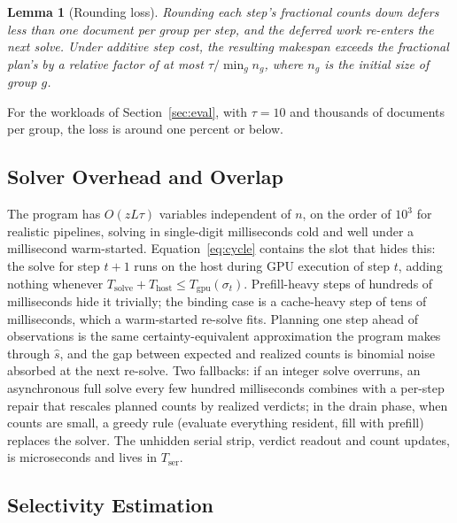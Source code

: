 \documentclass[10pt,twocolumn]{article}
\newtheorem{lemma}{Lemma}
\newcommand{\Tgpu}{T_{\mathrm{gpu}}}
\newcommand{\Thost}{T_{\mathrm{host}}}
\newcommand{\Tser}{T_{\mathrm{ser}}}
\newcommand{\shat}{\hat{s}}
\begin{document}
\begin{lemma}[Rounding loss]
\label{lem:round}
Rounding each step's fractional counts down defers less than one document per group per step, and the deferred work re-enters the next solve. Under additive step cost, the resulting makespan exceeds the fractional plan's by a relative factor of at most $\tau / \min_g n_g$, where $n_g$ is the initial size of group $g$.
\end{lemma}

For the workloads of Section~\ref{sec:eval}, with $\tau = 10$ and thousands of documents per group, the loss is around one percent or below.

\subsection{Solver Overhead and Overlap}
\label{sec:overhead}

The program has $O(zL\tau)$ variables independent of $n$, on the order of $10^3$ for realistic pipelines, solving in single-digit milliseconds cold and well under a millisecond warm-started. Equation~\eqref{eq:cycle} contains the slot that hides this: the solve for step $t{+}1$ runs on the host during GPU execution of step $t$, adding nothing whenever $T_{\mathrm{solve}} + \Thost \le \Tgpu(\sigma_t)$. Prefill-heavy steps of hundreds of milliseconds hide it trivially; the binding case is a cache-heavy step of tens of milliseconds, which a warm-started re-solve fits. Planning one step ahead of observations is the same certainty-equivalent approximation the program makes through $\shat$, and the gap between expected and realized counts is binomial noise absorbed at the next re-solve. Two fallbacks: if an integer solve overruns, an asynchronous full solve every few hundred milliseconds combines with a per-step repair that rescales planned counts by realized verdicts; in the drain phase, when counts are small, a greedy rule (evaluate everything resident, fill with prefill) replaces the solver. The unhidden serial strip, verdict readout and count updates, is microseconds and lives in $\Tser$.

\subsection{Selectivity Estimation}
\label{sec:selest}
\end{document}
